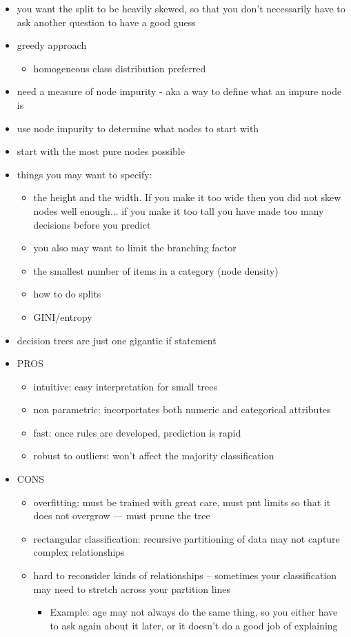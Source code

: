 \documentclass[12pt]{article}
\begin{document}
\begin{itemize}
		\item you want the split to be heavily skewed, so that you don't necessarily have to ask another question to have a good guess
		\item greedy approach 
		\begin{itemize}
			\item homogeneous class distribution preferred 
		\end{itemize}
		\item need a measure of node impurity - aka a way to define what an impure node is 
		\item use node impurity to determine what nodes to start with 
		\item start with the most pure nodes possible 
		\item things you may want to specify:
		\begin{itemize}
			\item the height and the width. If you make it too wide then you did not skew nodes well enough... if you make it too tall you have made too many decisions before you predict
			\item you also may want to limit the branching factor 
			\item the smallest number of items in a category (node density)
			\item how to do splits
			\item GINI/entropy
		\end{itemize}
		\item decision trees are just one gigantic if statement 
		\item PROS 
		\begin{itemize}
			\item intuitive: easy interpretation for small trees 
			\item non parametric: incorportates both numeric and categorical attributes
			\item fast: once rules are developed, prediction is rapid
			\item robust to outliers: won't affect the majority classification
		\end{itemize}
		\item CONS
		\begin{itemize}
			\item overfitting: must be trained with great care, must put limits so that it does not overgrow --- must prune the tree 
			\item rectangular classification: recursive partitioning of data may not capture complex relationships
			\item hard to reconsider kinds of relationships -- sometimes your classification may need to stretch across your partition lines
		\begin{itemize} \item Example: age may not always do the same thing, so you either have to ask again about it later, or it doesn't do a good job of explaining \end{itemize}
		\end{itemize}
	\end{itemize}
	\vfill
	\clearpage
\end{document}
